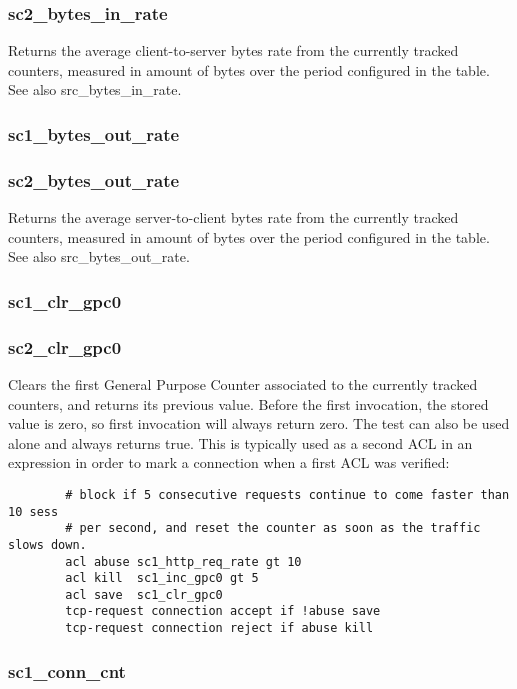 \subsubsection{sc2\_bytes\_in\_rate}
  Returns the average client-to-server bytes rate from the currently tracked
  counters, measured in amount of bytes over the period configured in the
  table. See also src\_bytes\_in\_rate.

\subsubsection{sc1\_bytes\_out\_rate}
\subsubsection{sc2\_bytes\_out\_rate}
  Returns the average server-to-client bytes rate from the currently tracked
  counters, measured in amount of bytes over the period configured in the
  table. See also src\_bytes\_out\_rate.

\subsubsection{sc1\_clr\_gpc0}
\subsubsection{sc2\_clr\_gpc0}
  Clears the first General Purpose Counter associated to the currently tracked
  counters, and returns its previous value. Before the first invocation, the
  stored value is zero, so first invocation will always return zero. The test
  can also be used alone and always returns true. This is typically used as a
  second ACL in an expression in order to mark a connection when a first ACL
  was verified:
  
  \begin{verbatim}
        # block if 5 consecutive requests continue to come faster than 10 sess
        # per second, and reset the counter as soon as the traffic slows down.
        acl abuse sc1_http_req_rate gt 10
        acl kill  sc1_inc_gpc0 gt 5
        acl save  sc1_clr_gpc0
        tcp-request connection accept if !abuse save
        tcp-request connection reject if abuse kill
  \end{verbatim}

\subsubsection{sc1\_conn\_cnt}
